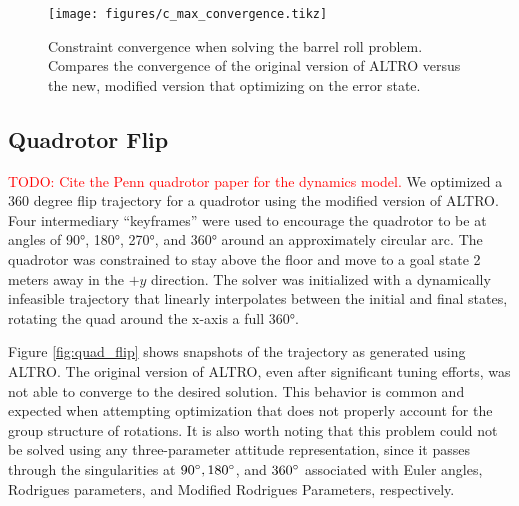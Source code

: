\documentclass[letterpaper, 10 pt, conference]{ieeeconf}  %
\newcommand{\todo}[1]{\textcolor{red}{TODO: #1}}
\begin{document}
        \begin{figure}[h]
            \centering
            \texttt{[image: figures/c\_max\_convergence.tikz]}
            \caption{Constraint convergence when solving the barrel roll problem. Compares 
            the convergence of the original version of ALTRO versus the new, modified version
            that optimizing on the error state.}
            \label{fig:c_max_convergence}
        \end{figure}

    \subsection{Quadrotor Flip}
    \todo{Cite the Penn quadrotor paper for the dynamics model.}
        We optimized a 360 degree flip trajectory for a quadrotor using the 
        modified version of ALTRO.
	    Four intermediary ``keyframes'' were used to encourage the quadrotor to be at angles
        of \ang{90}, \ang{180}, \ang{270}, and \ang{360} around an approximately circular arc.
        The quadrotor was constrained
	    to stay above the floor and move to a goal state 2 meters away in the $+y$
	    direction. The solver was initialized with a dynamically infeasible trajectory
	    that linearly interpolates between the initial and final states, rotating the
        quad around the x-axis a full \ang{360}.

	    Figure \ref{fig:quad_flip} shows snapshots of the trajectory as generated using
	    ALTRO. The original version of ALTRO, even after significant tuning efforts,
	    was not able to converge to the desired solution.
	    This behavior is common and expected when attempting optimization that does not
	    properly account for the group structure of rotations. It is also worth noting
	    that this problem could not be solved using any three-parameter attitude
	    representation, since it passes through the singularities at $90\degree,
	    180\degree$, and $360\degree$ associated with Euler angles, Rodrigues parameters, and
	    Modified Rodrigues Parameters, respectively.
\end{document}

